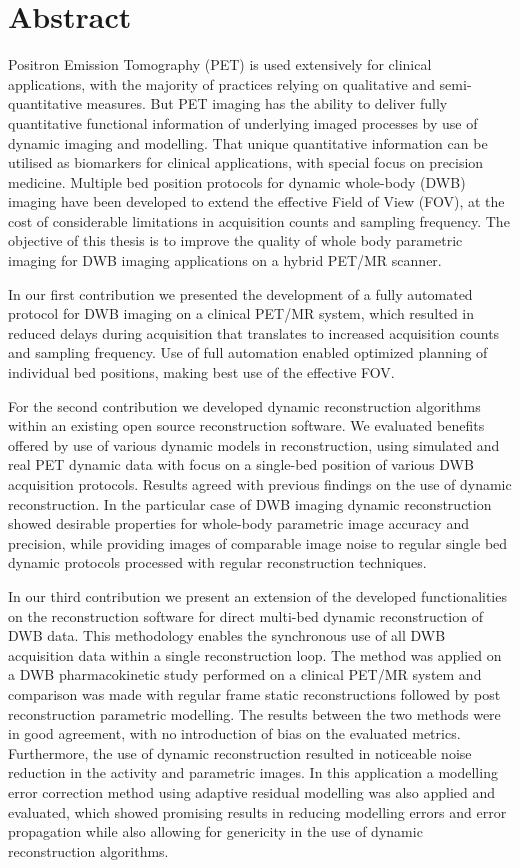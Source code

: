 \section*{Abstract}
Positron Emission Tomography (PET) is used extensively for clinical applications, with the majority of practices relying on qualitative and semi-quantitative measures. But PET imaging has the ability to deliver fully quantitative functional information of underlying imaged processes by use of dynamic imaging and modelling. That unique quantitative information can be utilised as biomarkers for clinical applications, with special focus on precision medicine. Multiple bed position protocols for dynamic whole-body (DWB) imaging have been developed to extend the effective Field of View (FOV), at the cost of considerable limitations in acquisition counts and sampling frequency. The objective of this thesis is to improve the quality of whole body parametric imaging for DWB imaging applications on a hybrid PET/MR scanner.

In our first contribution we presented the development of a fully automated protocol for DWB imaging on a clinical PET/MR system, which resulted in reduced delays during acquisition that translates to increased acquisition counts and sampling frequency. Use of full automation enabled optimized planning of individual bed positions, making best use of the effective FOV. 

For the second contribution we developed dynamic reconstruction algorithms within an existing open source reconstruction software. We evaluated benefits offered by use of various dynamic models in reconstruction, using simulated and real PET dynamic data with focus on a single-bed position of various DWB acquisition protocols.
Results agreed with previous findings on the use of dynamic reconstruction. In the particular case of DWB imaging dynamic reconstruction showed desirable properties for whole-body parametric image accuracy and precision, while providing images of comparable image noise to regular single bed dynamic protocols processed with regular reconstruction techniques.

In our third contribution we present an extension of the developed functionalities on the reconstruction software for direct multi-bed dynamic reconstruction of DWB data. This methodology enables the synchronous use of all DWB acquisition data within a single reconstruction loop. The method was applied on a DWB pharmacokinetic study performed on a clinical PET/MR system and comparison was made with regular frame static reconstructions followed by post reconstruction parametric modelling. The results between the two methods were in good agreement, with no introduction of bias on the evaluated metrics. Furthermore, the use of dynamic reconstruction resulted in noticeable noise reduction in the activity and parametric images. In this application a modelling error correction method using adaptive residual modelling was also applied and evaluated, which showed promising results in reducing modelling errors and error propagation while also allowing for genericity in the use of dynamic reconstruction algorithms.

